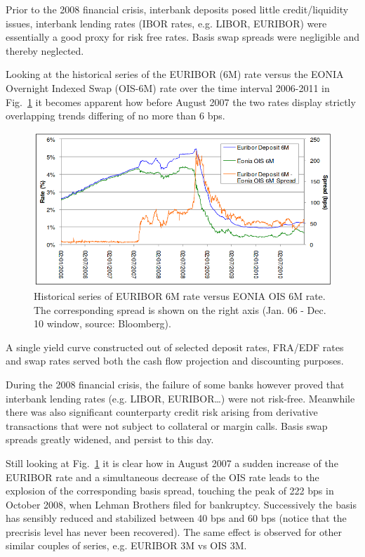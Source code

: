 Prior to the 2008 financial crisis, interbank deposits posed little 
credit/liquidity issues, interbank lending rates (IBOR rates, e.g. LIBOR, EURIBOR)
were essentially a good proxy for risk free rates. 
Basis swap spreads were negligible and thereby neglected. 

Looking at the historical series of the EURIBOR (6M) rate versus the EONIA 
Overnight Indexed Swap (OIS-6M) rate over the time interval 2006-2011 in Fig.~\ref{fig:credit_crunch} it becomes
apparent how before August 2007 the two rates display strictly overlapping trends differing of no more than 6 bps.

\begin{figure}[htb]
	\centering
	\includegraphics[width=0.9\linewidth]{figures/credit_crunch.png}
	\caption{Historical series of EURIBOR 6M rate versus EONIA OIS 6M rate. The corresponding spread 
		is shown on the right axis (Jan. 06 - Dec. 10 window, source: Bloomberg).}
	\label{fig:credit_crunch}
\end{figure}

A single yield curve constructed out of selected deposit rates, FRA/EDF rates 
and swap rates served both the cash flow projection and discounting purposes.

During the 2008 financial crisis, the failure of some banks however proved that interbank lending rates (e.g. LIBOR, EURIBOR\ldots) were not risk-free. Meanwhile
there was also significant counterparty credit risk arising from derivative
transactions that were not subject to collateral or margin calls. 
Basis swap spreads greatly widened, and persist to this day. 

Still looking at Fig.~\ref{fig:credit_crunch} it is clear how in August 2007
a sudden increase of the EURIBOR rate and a simultaneous decrease of the OIS rate
leads to the explosion of the corresponding basis spread, touching the peak of 222
bps in October 2008, when Lehman Brothers filed for bankruptcy. Successively the
basis has sensibly reduced and stabilized between 40 bps and 60 bps (notice that the precrisis 
level has never been recovered). 
The same effect is observed for other similar couples of series, e.g. EURIBOR 3M 
vs OIS 3M.

